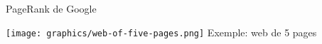 
\newcommand{\TMatrix}
	{\left(\begin{array}{ccccc}
	0 & 1/2 & 1/3 & 1 & 0
	\\
	\overset{{\color{white}-}}{1} & 0 & 1/3 & {\color{white}.}0{\color{white}.} & 1/3
	\\
	\overset{{\color{white}-}}{0} & 1/2 & 0 & 0 & 1/3
	\\
	\overset{{\color{white}-}}{0} & 0 & 0 & 0 & 1/3
	\\
	\overset{{\color{white}-}}{0} & 0 & 1/3 & 0 & 0
	\end{array}\right)}


\begin{frame}{\Large PageRank de Google}

\begin{center}
\vskip 0.5cm
\texttt{[image: graphics/web-of-five-pages.png]}
\vskip 0.1cm
\Large Exemple: web de 5 pages
\end{center}

\end{frame}
\normalsize


